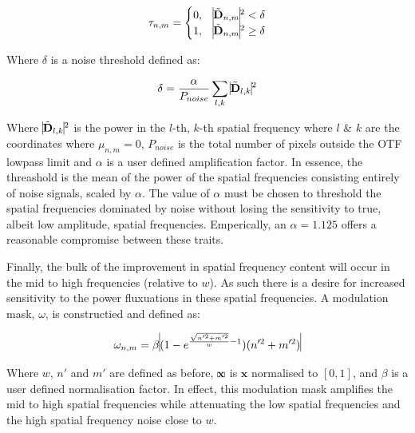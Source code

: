 	\begin{equation}\label{eq:noise_threshold_mask}
	\tau_{n,m} = 
	\begin{cases}
	0, & \vline \tilde{\textbf{D}}_{n,m} \vline^2 < \delta\\
	1, & \vline \tilde{\textbf{D}}_{n,m} \vline^2 \ge \delta\\ 
	\end{cases}
	\end{equation}
	
	Where $\delta$ is a noise threshold defined as:
		
	\begin{equation}\label{eq:noise_threshold}
	\delta = \frac{\alpha}{P_{noise}}\sum\limits_{l,k}{\vline \tilde{\textbf{D}}_{l,k} \vline^2}
	\end{equation}
	
	Where $\vline \tilde{\textbf{D}}_{l,k} \vline^2$ is the power in the 
	$l$-th, $k$-th spatial frequency where $l$ \& $k$ are the coordinates 
	where $\mu_{n,m} = 0$, $P_{noise}$ is the total number of pixels 
	outside the OTF lowpass limit and $\alpha$ is a user defined 
	amplification factor. In essence, the threashold is the mean of the
	power of the spatial frequencies consisting entirely of noise signals,
	scaled by $\alpha$.	The value of $\alpha$ must be chosen to threshold
	the spatial frequencies dominated by noise without losing the sensitivity
	to true, albeit low amplitude, spatial frequencies. Emperically, an 
	$\alpha = 1.125$ offers a reasonable compromise between these traits.
	
	Finally, the bulk of the improvement in spatial frequency content will
	occur in the mid to high frequencies (relative to $w$). As such there is 
	a desire for increased sensitivity to the power fluxuations in these 
	spatial frequencies. A modulation mask, $\omega$, is constructied and 
	defined as:
	
	\begin{equation}\label{eq:attenuation_mask_norm_and_scaled}
	\omega_{n,m} = \beta \vline (1 - e^{\frac{\sqrt{n'^{2} + m'^{2}}}{w}-1}) (n'^{2} + m'^{2}) \vline
	\end{equation}
	
	Where $w$, $n'$ and $m'$ are defined as before, $\vline\textbf{x} \vline$ 
	is $\textbf{x}$ normalised to $[0,1]$, and $\beta$ is a user defined 
	normalisation factor. In effect, this modulation mask amplifies the mid 
	to high spatial frequencies while attenuating the low spatial frequencies 
	and the high spatial frequency noise close to $w$.
	

